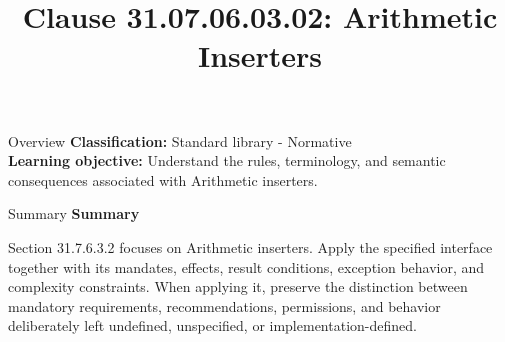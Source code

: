 \documentclass[10pt,letterpaper]{article}
\title{Clause 31.07.06.03.02: Arithmetic Inserters}
\author{}
\date{}
\begin{document}
\maketitle
\begin{CornellOverviewBox}{Overview}
\textbf{Classification:} Standard library - Normative\\[2pt]
\textbf{Learning objective:} Understand the rules, terminology, and semantic consequences associated with Arithmetic inserters.
\end{CornellOverviewBox}\begin{CornellSummaryBox}{Summary}
{\sffamily\bfseries\color{Accent} Summary}\par\vspace{3pt}Section 31.7.6.3.2 focuses on Arithmetic inserters. Apply the specified interface together with its mandates, effects, result conditions, exception behavior, and complexity constraints. When applying it, preserve the distinction between mandatory requirements, recommendations, permissions, and behavior deliberately left undefined, unspecified, or implementation-defined.
\end{CornellSummaryBox}
\end{document}
